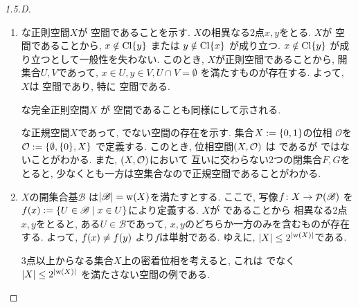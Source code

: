 \documentclass[uplatex, dvipdfmx, a4paper, 12pt, class=jsarticle, crop=false]{standalone}
\begin{document}
\renewcommand{\labelenumi}{(\alph{enumi})}
\begin{proof}[1.5.D]\label{eng-1-5-D-proof}
	\begin{enumerate}
		\item {} な正則空間\( X \)が  空間であることを示す.
		\( X \)の相異なる2点\( x, y \)をとる.
		\( X \)が  空間であることから,
		\( x \notin \topcl \lrbrace{y} \)
		または
		\( y \notin \topcl \lrbrace{x} \)
		が成り立つ.
		\( x \notin \topcl \lrbrace{y} \)
		が成り立つとして一般性を失わない.
		このとき, \( X \)が正則空間であることから,
		開集合\( U, V \)であって,
		\( x \in U, y \in V, U \cap V = \emptyset \)
		を満たすものが存在する.
		よって, \( X \)は \Hausdorff 空間であり,
		特に  空間である.

		 な完全正則空間\( X \)
		が  空間であることも同様にして示される.

		 な正規空間\( X \)であって,
		 でない空間の存在を示す.
		集合\( X \defeq \lrbrace{0, 1} \)の位相
		\( \mathcal{O} \)を
		\( \mathcal{O} \defeq \lrbrace{\emptyset,
		\lrbrace{0}, X} \)
		で定義する.
		このとき, 位相空間\( \lrparen{X, \mathcal{O}} \)
		は  であるが ではないことがわかる.
		また, \( \lrparen{X, \mathcal{O}} \)において
		互いに交わらない2つの閉集合\( F, G \)をとると,
		少なくとも一方は空集合なので正規空間であることがわかる.

		\item \( X \)の開集合基\( \mathscr{B} \)
		は\( \cardinality{\mathscr{B}}
		= \topweight{X} \)を満たすとする.
		ここで, 写像\( f\colon X\to\mathop{\mathcal{P}}\nolimits(\mathscr{B}) \)
		を\( f(x) \defeq \setcomp{U \in \mathscr{B}}
		{x \in U} \)により定義する.
		\( X \)が  であることから
		相異なる2点\( x, y \)をとると,
		ある\( U \in \mathscr{B} \)であって,
		\( x, y \)のどちらか一方のみを含むものが存在する.
		よって, \( \mappt{f}{x} \neq \mappt{f}{y} \)
		より\( f \)は単射である.
		ゆえに, \( \cardinality{X} \leq
		2^{\cardinality{{\topweight{X}}}} \)である.

		3点以上からなる集合\( X \)上の密着位相を考えると,
		これは  でなく
		\( \cardinality{X} \leq
		2^{\cardinality{\topweight{X}}} \)
		を満たさない空間の例である.


\end{enumerate}
\end{proof}
\end{document}
